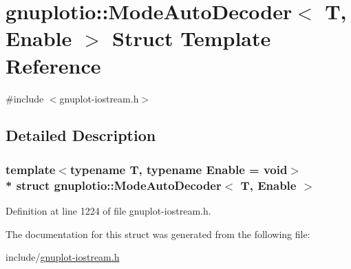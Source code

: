 \hypertarget{structgnuplotio_1_1_mode_auto_decoder}{}\section{gnuplotio\+:\+:Mode\+Auto\+Decoder$<$ T, Enable $>$ Struct Template Reference}
\label{structgnuplotio_1_1_mode_auto_decoder}


{\ttfamily \#include $<$gnuplot-\/iostream.\+h$>$}



\subsection{Detailed Description}
\subsubsection*{template$<$typename T, typename Enable = void$>$\\*
struct gnuplotio\+::\+Mode\+Auto\+Decoder$<$ T, Enable $>$}



Definition at line 1224 of file gnuplot-\/iostream.\+h.



The documentation for this struct was generated from the following file\+:\begin{DoxyCompactItemize}
\item 
include/\hyperlink{gnuplot-iostream_8h}{gnuplot-\/iostream.\+h}\end{DoxyCompactItemize}
